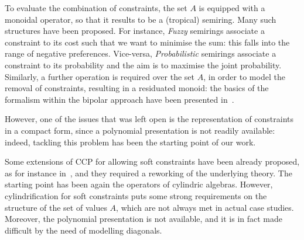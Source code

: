\documentclass{llncs}
\begin{document}
To evaluate the combination of constraints, the set $A$ is equipped with a monoidal operator, so that it results to be a (tropical) semiring. 
%
Many such structures have been proposed. For instance, \emph{Fuzzy} semirings associate a constraint to its cost such that we want to minimise the sum: this falls into the range of negative preferences. Vice-versa, \emph{Probabilistic} semirings associate a constraint to its probability and the aim is to maximise the joint probability.
Similarly, a further operation is required over the set $A$, in order to model the removal of constraints, 
resulting in a residuated monoid: the basics of the formalism within the bipolar approach have been presented in~\cite{ipl17}.

However, one of the issues that was left open is the representation of constraints in a compact form, since a polynomial presentation is not readily available:
indeed, tackling this problem has been the starting point of our work.

\medskip

Some extensions of CCP for allowing soft constraints have been already proposed, as for instance in~\cite{scc}, and they required a reworking of the underlying theory.
The starting point has been again the operators of cylindric algebras. However, cylindrification for soft constraints puts some strong requirements on the structure of the set of values $A$, 
which are not always met in actual case studies. Moreover, the polynomial presentation is not available, and it is in fact made difficult by the need of modelling diagonals.
\end{document}

